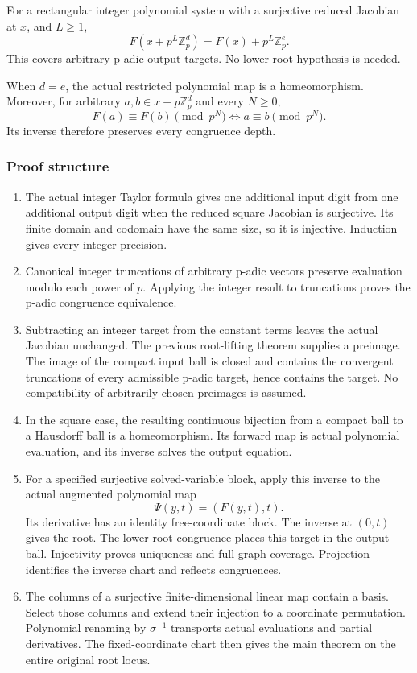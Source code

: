 For a rectangular integer polynomial system with a surjective reduced
Jacobian at \(x\), and \(L\ge1\), \[
F(x+p^L\mathbb Z_p^d)=F(x)+p^L\mathbb Z_p^e.
\] This covers arbitrary p-adic output targets. No lower-root hypothesis
is needed.

When \(d=e\), the actual restricted polynomial map is a homeomorphism.
Moreover, for arbitrary \(a,b\in x+p\mathbb Z_p^d\) and every \(N\ge0\),
\[
F(a)\equiv F(b)\pmod{p^N}\iff a\equiv b\pmod{p^N}.
\] Its inverse therefore preserves every congruence depth.

\hypertarget{cont5:proof-structure}{%
\subsubsection{Proof structure}\label{cont5:proof-structure}}

\begin{enumerate}
\def\labelenumi{\arabic{enumi}.}
\tightlist
\item
  The actual integer Taylor formula gives one additional input digit
  from one additional output digit when the reduced square Jacobian is
  surjective. Its finite domain and codomain have the same size, so it
  is injective. Induction gives every integer precision.
\item
  Canonical integer truncations of arbitrary p-adic vectors preserve
  evaluation modulo each power of \(p\). Applying the integer result to
  truncations proves the p-adic congruence equivalence.
\item
  Subtracting an integer target from the constant terms leaves the
  actual Jacobian unchanged. The previous root-lifting theorem supplies
  a preimage. The image of the compact input ball is closed and contains
  the convergent truncations of every admissible p-adic target, hence
  contains the target. No compatibility of arbitrarily chosen preimages
  is assumed.
\item
  In the square case, the resulting continuous bijection from a compact
  ball to a Hausdorff ball is a homeomorphism. Its forward map is actual
  polynomial evaluation, and its inverse solves the output equation.
\item
  For a specified surjective solved-variable block, apply this inverse
  to the actual augmented polynomial map \[
  \Psi(y,t)=(F(y,t),t).
  \] Its derivative has an identity free-coordinate block. The inverse
  at \((0,t)\) gives the root. The lower-root congruence places this
  target in the output ball. Injectivity proves uniqueness and full
  graph coverage. Projection identifies the inverse chart and reflects
  congruences.
\item
  The columns of a surjective finite-dimensional linear map contain a
  basis. Select those columns and extend their injection to a coordinate
  permutation. Polynomial renaming by \(\sigma^{-1}\) transports actual
  evaluations and partial derivatives. The fixed-coordinate chart then
  gives the main theorem on the entire original root locus.
\end{enumerate}

